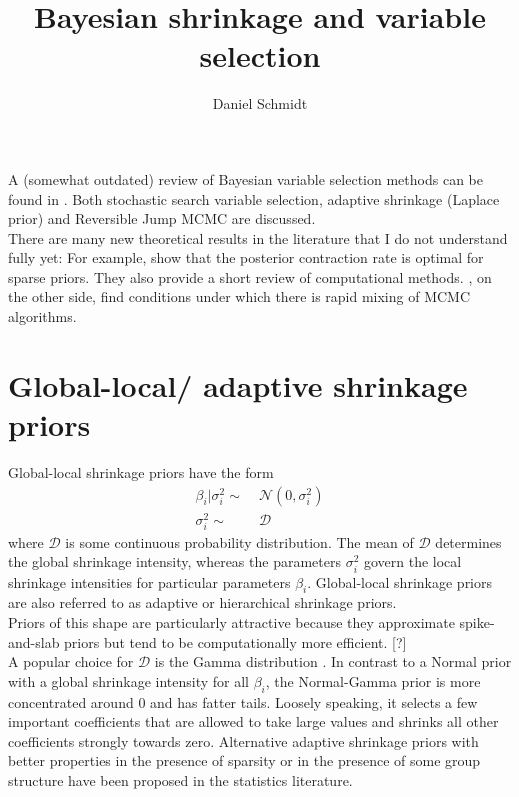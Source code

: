 \documentclass[12pt,a4paper]{scrartcl}
\title{Bayesian shrinkage and variable selection}
\author{Daniel Schmidt}
\begin{document}
	
\maketitle

A (somewhat outdated) review of Bayesian variable selection methods can be found in \citet{OHaraSillanpaa2009}. Both stochastic search variable selection, adaptive shrinkage (Laplace prior) and Reversible Jump MCMC are discussed.\\

There are many new theoretical results in the literature that I do not understand fully yet: For example, \citet{CastilloEtal2015} show that the posterior contraction rate is optimal for sparse priors. They also provide a short review of computational methods. \citet{YangEtal2016}, on the other side, find conditions under which there is rapid mixing of MCMC algorithms.

\section{Global-local/ adaptive shrinkage priors}

Global-local shrinkage priors have the form
\begin{align*}
\beta_i|\sigma^2_i \sim&\;\mathcal{N}(0, \sigma^2_i) \\
\sigma_i^2 \sim&\;\mathcal{D}
\end{align*}
where $\mathcal{D}$ is some continuous probability distribution. %
The mean of $\mathcal{D}$ determines the global shrinkage intensity, whereas the parameters $\sigma_i^2$ govern the local shrinkage intensities for particular parameters $\beta_i$. Global-local shrinkage priors are also referred to as adaptive or hierarchical shrinkage priors.\\

Priors of this shape are particularly attractive because they approximate spike-and-slab priors but tend to be computationally more efficient. [?]\\

A popular choice for $\mathcal{D}$ is the Gamma distribution \citep{GriffinBrown2010}. In contrast to a Normal prior with a global shrinkage intensity for all $\beta_i$, the Normal-Gamma prior is more concentrated around $0$ and has fatter tails. Loosely speaking, it selects a few important coefficients that are allowed to take large values and shrinks all other coefficients strongly towards zero.  Alternative adaptive shrinkage priors with better properties in the presence of sparsity \citep{CarvalhoEtal2010} or in the presence of some group structure \citep{LiLin2010} have been proposed in the statistics literature.\\
\end{document}

